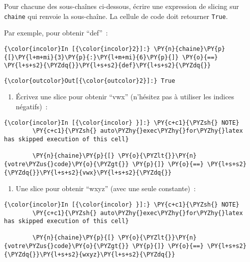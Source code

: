     Pour chacune des sous-chaînes ci-dessous, écrire une expression de
slicing sur \texttt{chaine} qui renvoie la sous-chaîne. La cellule de
code doit retourner \texttt{True}.

    Par exemple, pour obtenir ``def''~:

    \begin{Verbatim}[commandchars=\\\{\}]
{\color{incolor}In [{\color{incolor}2}]:} \PY{n}{chaine}\PY{p}{[}\PY{l+m+mi}{3}\PY{p}{:}\PY{l+m+mi}{6}\PY{p}{]} \PY{o}{==} \PY{l+s+s2}{\PYZdq{}}\PY{l+s+s2}{def}\PY{l+s+s2}{\PYZdq{}}
\end{Verbatim}


\begin{Verbatim}[commandchars=\\\{\}]
{\color{outcolor}Out[{\color{outcolor}2}]:} True
\end{Verbatim}
            
    \begin{enumerate}
\def\labelenumi{\arabic{enumi})}
\tightlist
\item
  Écrivez une slice pour obtenir ``vwx'' (n'hésitez pas à utiliser les
  indices négatifs)~:
\end{enumerate}

    \begin{Verbatim}[commandchars=\\\{\}]
{\color{incolor}In [{\color{incolor} }]:} \PY{c+c1}{\PYZsh{} NOTE}
        \PY{c+c1}{\PYZsh{} auto\PYZhy{}exec\PYZhy{}for\PYZhy{}latex has skipped execution of this cell}
        
        \PY{n}{chaine}\PY{p}{[} \PY{o}{\PYZlt{}}\PY{n}{votre\PYZus{}code}\PY{o}{\PYZgt{}} \PY{p}{]} \PY{o}{==} \PY{l+s+s2}{\PYZdq{}}\PY{l+s+s2}{vwx}\PY{l+s+s2}{\PYZdq{}}
\end{Verbatim}


    \begin{enumerate}
\def\labelenumi{\arabic{enumi})}
\setcounter{enumi}{1}
\tightlist
\item
  Une slice pour obtenir ``wxyz'' (avec une seule constante)~:
\end{enumerate}

    \begin{Verbatim}[commandchars=\\\{\}]
{\color{incolor}In [{\color{incolor} }]:} \PY{c+c1}{\PYZsh{} NOTE}
        \PY{c+c1}{\PYZsh{} auto\PYZhy{}exec\PYZhy{}for\PYZhy{}latex has skipped execution of this cell}
        
        \PY{n}{chaine}\PY{p}{[} \PY{o}{\PYZlt{}}\PY{n}{votre\PYZus{}code}\PY{o}{\PYZgt{}} \PY{p}{]} \PY{o}{==} \PY{l+s+s2}{\PYZdq{}}\PY{l+s+s2}{wxyz}\PY{l+s+s2}{\PYZdq{}}
\end{Verbatim}


